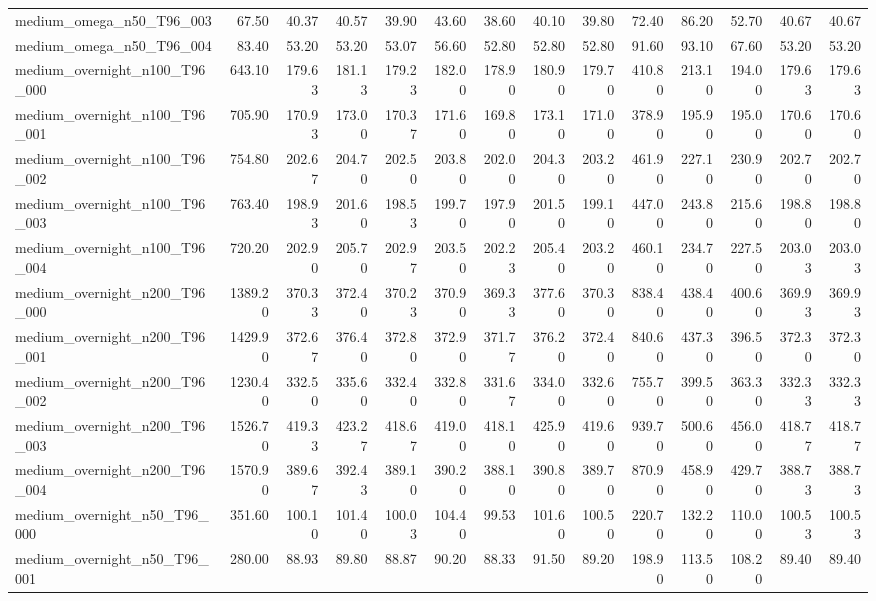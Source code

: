 \begin{table}[htbp]
\begin{tabular}{lrrrrrrrrrrrrr}
medium\_omega\_n50\_T96\_003 & 67.50 & 40.37 & 40.57 & 39.90 & 43.60 & 38.60 & 40.10 & 39.80 & 72.40 & 86.20 & 52.70 & 40.67 & 40.67 \\
medium\_omega\_n50\_T96\_004 & 83.40 & 53.20 & 53.20 & 53.07 & 56.60 & 52.80 & 52.80 & 52.80 & 91.60 & 93.10 & 67.60 & 53.20 & 53.20 \\
medium\_overnight\_n100\_T96\_000 & 643.10 & 179.63 & 181.13 & 179.23 & 182.00 & 178.90 & 180.90 & 179.70 & 410.80 & 213.10 & 194.00 & 179.63 & 179.63 \\
medium\_overnight\_n100\_T96\_001 & 705.90 & 170.93 & 173.00 & 170.37 & 171.60 & 169.80 & 173.10 & 171.00 & 378.90 & 195.90 & 195.00 & 170.60 & 170.60 \\
medium\_overnight\_n100\_T96\_002 & 754.80 & 202.67 & 204.70 & 202.50 & 203.80 & 202.00 & 204.30 & 203.20 & 461.90 & 227.10 & 230.90 & 202.70 & 202.70 \\
medium\_overnight\_n100\_T96\_003 & 763.40 & 198.93 & 201.60 & 198.53 & 199.70 & 197.90 & 201.50 & 199.10 & 447.00 & 243.80 & 215.60 & 198.80 & 198.80 \\
medium\_overnight\_n100\_T96\_004 & 720.20 & 202.90 & 205.70 & 202.97 & 203.50 & 202.23 & 205.40 & 203.20 & 460.10 & 234.70 & 227.50 & 203.03 & 203.03 \\
medium\_overnight\_n200\_T96\_000 & 1389.20 & 370.33 & 372.40 & 370.23 & 370.90 & 369.33 & 377.60 & 370.30 & 838.40 & 438.40 & 400.60 & 369.93 & 369.93 \\
medium\_overnight\_n200\_T96\_001 & 1429.90 & 372.67 & 376.40 & 372.80 & 372.90 & 371.77 & 376.20 & 372.40 & 840.60 & 437.30 & 396.50 & 372.30 & 372.30 \\
medium\_overnight\_n200\_T96\_002 & 1230.40 & 332.50 & 335.60 & 332.40 & 332.80 & 331.67 & 334.00 & 332.60 & 755.70 & 399.50 & 363.30 & 332.33 & 332.33 \\
medium\_overnight\_n200\_T96\_003 & 1526.70 & 419.33 & 423.27 & 418.67 & 419.00 & 418.10 & 425.90 & 419.60 & 939.70 & 500.60 & 456.00 & 418.77 & 418.77 \\
medium\_overnight\_n200\_T96\_004 & 1570.90 & 389.67 & 392.43 & 389.10 & 390.20 & 388.10 & 390.80 & 389.70 & 870.90 & 458.90 & 429.70 & 388.73 & 388.73 \\
medium\_overnight\_n50\_T96\_000 & 351.60 & 100.10 & 101.40 & 100.03 & 104.40 & 99.53 & 101.60 & 100.50 & 220.70 & 132.20 & 110.00 & 100.53 & 100.53 \\
medium\_overnight\_n50\_T96\_001 & 280.00 & 88.93 & 89.80 & 88.87 & 90.20 & 88.33 & 91.50 & 89.20 & 198.90 & 113.50 & 108.20 & 89.40 & 89.40 \\

\end{tabular}
\end{table}

